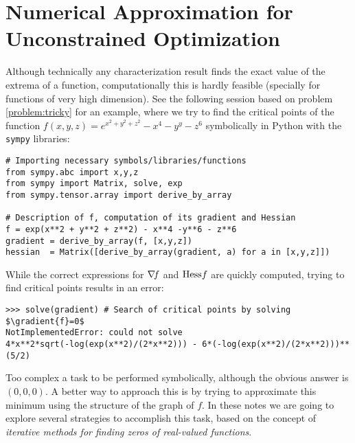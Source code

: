 
\chapter{Numerical Approximation for Unconstrained Optimization}\label{chapter:UnconstrainedNumerical}
Although technically any characterization result finds the exact value of the extrema of a function, computationally this is hardly feasible (specially for functions of very high dimension).  See the following session based on problem \ref{problem:tricky} for an example, where we try to find the critical points of the function $f(x,y,z)=e^{x^2+y^2+z^2}-x^4-y^y-z^6$ symbolically in Python with the \texttt{sympy} libraries:

\begin{verbatim}
# Importing necessary symbols/libraries/functions
from sympy.abc import x,y,z
from sympy import Matrix, solve, exp
from sympy.tensor.array import derive_by_array

# Description of f, computation of its gradient and Hessian
f = exp(x**2 + y**2 + z**2) - x**4 -y**6 - z**6
gradient = derive_by_array(f, [x,y,z])
hessian  = Matrix([derive_by_array(gradient, a) for a in [x,y,z]])
\end{verbatim}
While the correct expressions for $\mathop{\nabla\! {f}}$ and $\mathop{\mathrm{Hess}{f}}$ are quickly computed, trying to find critical points results in an error:
\begin{verbatim}
>>> solve(gradient) # Search of critical points by solving $\gradient{f}=0$
NotImplementedError: could not solve 
4*x**2*sqrt(-log(exp(x**2)/(2*x**2))) - 6*(-log(exp(x**2)/(2*x**2)))**(5/2)
\end{verbatim}

Too complex a task to be performed symbolically, although the obvious answer is $(0,0,0)$.  A better way to approach this is by trying to approximate this minimum using the structure of the graph of $f$.  In these notes we are going to explore several strategies to accomplish this task, based on the concept of \emph{iterative methods for finding zeros of real-valued functions}.




